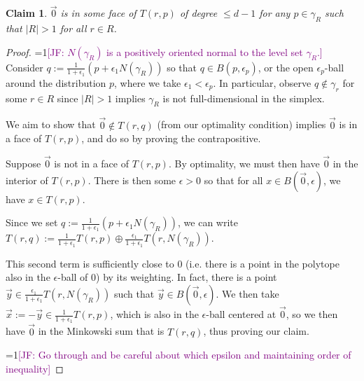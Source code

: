 \documentclass[12pt]{article}
\newcommand{\Comments}{1}
\newcommand{\mynote}[2]{\ifnum\Comments=1\textcolor{#1}{#2}\fi}
\newcommand{\jessie}[1]{\mynote{purple}{[JF: #1]}}
\newcommand{\simplex}{\Delta_\Y}
\newcommand{\Y}{\mathcal{Y}}
\newcommand{\inter}[1]{\mathrm{int}(#1)}%
\newtheorem{claim}{Claim}
\begin{document}
\begin{claim}\label{claim:face-lattice-multivalued-sets}
	$\vec 0$ is in some face of $T(r,p)$ of degree $\leq d-1$ for any $p \in \gamma_R$ such that $|R| > 1$ for all $r \in R$.
\end{claim}
\begin{proof}
	\jessie{$N(\gamma_R)$ is a positively oriented normal to the level set $\gamma_R$.}
	Consider $q := \frac{1}{1 +\epsilon_1}(p + \epsilon_1 N(\gamma_{R}))$ so that $q \in B(p, \epsilon_p)$, or the open $\epsilon_p$-ball around the distribution $p$, where we take $\epsilon_1 < \epsilon_p$.
	In particular, observe $q \not \in \gamma_r$ for some $r \in R$ since $|R|>1$ implies $\gamma_R$ is not full-dimensional in the simplex.
	
	We aim to show that $\vec 0 \not\in T(r, q)$ (from our optimality condition) implies $\vec 0$ is in a face of $T(r,p)$, and do so by proving the contrapositive.
	
	Suppose $\vec 0$ is not in a face of $T(r,p)$.
	By optimality, we must then have $\vec 0$ in the interior of $T(r,p)$.
	There is then some $\epsilon >0$ so that for all $x \in B(\vec 0, \epsilon)$, we have $x \in T(r,p)$.
	
	Since we set $q := \frac{1}{1 +\epsilon_1}(p + \epsilon_1 N(\gamma_{R}))$, we can write $T(r,q) := \frac{1}{1+\epsilon_1}T(r,p) \oplus \frac {\epsilon_1}{1 + \epsilon_1} T(r, N(\gamma_{R}))$.
	
	This second term is sufficiently close to $0$ (i.e. there is a point in the polytope also in the $\epsilon$-ball of $0$) by its weighting.  In fact, there is a point $\vec y \in \frac {\epsilon_1}{1 + \epsilon_1} T(r, N(\gamma_{R}))$ such that $\vec y \in B(\vec 0, \epsilon)$.
	We then take $\vec x := -\vec y \in \frac{1}{1 + \epsilon_1}T(r,p)$, which is also in the $\epsilon$-ball centered at $\vec 0$, so we then have $\vec 0$ in the Minkowski sum that is $T(r,q)$, thus proving our claim.
	
	\jessie{Go through and be careful about which epsilon and maintaining order of inequality}
%	
%	
%	
%	
\end{proof}
\end{document}
